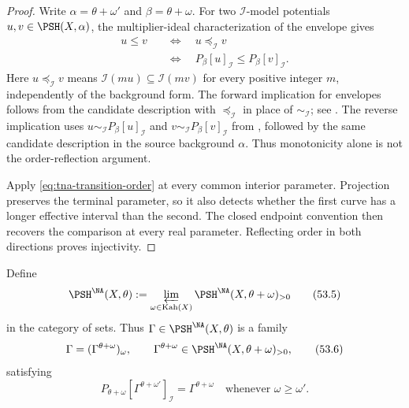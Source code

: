 \begin{proof}
Write $\alpha=\theta+\omega'$ and $\beta=\theta+\omega$.
For two $\mathcal I$-model potentials $u,v\in\PSH(X,\alpha)$,
the multiplier-ideal characterization of the envelope gives
\[
 \begin{split}
 u\leq v
 &\quad\Longleftrightarrow\quad
 u\preceq_{\mathcal I}v\\
 &\quad\Longleftrightarrow\quad
 P_\beta[u]_{\mathcal I}\leq P_\beta[v]_{\mathcal I}.
 \end{split}
\tag{53.4a}\label{eq:tna-transition-order}
\]
Here $u\preceq_{\mathcal I}v$ means
$\mathcal I(mu)\subseteq\mathcal I(mv)$ for every positive integer
$m$, independently of the background form.
The forward implication for envelopes follows from the candidate
description with $\preceq_{\mathcal I}$ in place of
$\sim_{\mathcal I}$; see
\cite[Corollary~6.1.3 and Proposition~6.1.3]{XiaBook}.
The reverse implication uses
$u\sim_{\mathcal I}P_\beta[u]_{\mathcal I}$ and
$v\sim_{\mathcal I}P_\beta[v]_{\mathcal I}$ from
, followed by the same candidate
description in the source background $\alpha$.
Thus monotonicity alone is not the order-reflection argument.

Apply \eqref{eq:tna-transition-order} at every common interior
parameter. Projection preserves the terminal parameter, so it
also detects whether the first curve has a longer effective interval
than the second. The closed endpoint convention then recovers
the comparison at every real parameter.
Reflecting order in both directions proves injectivity.
\end{proof}


\par\noindent\begin{minipage}{\textwidth}
\begin{definition}
\label{def:tna-pshna}
Define
\[
 \PSH^{\NA}(X,\theta)
 :=
 \varprojlim_{\omega\in\operatorname{Kah}(X)}
       \PSH^{\NA}(X,\theta+\omega)_{>0}
\tag{53.5}\label{eq:tna-inverse-limit}
\]
in the category of sets.  Thus
$\Gamma\in\PSH^{\NA}(X,\theta)$ is a family
\[
        \Gamma=(\Gamma^{\theta+\omega})_\omega,
\qquad
        \Gamma^{\theta+\omega}
          \in\PSH^{\NA}(X,\theta+\omega)_{>0},
\tag{53.6}\label{eq:tna-components}
\]
satisfying
\[
 P_{\theta+\omega}
 [\Gamma^{\theta+\omega'}]_{\mathcal I}
 =\Gamma^{\theta+\omega}
 \quad\text{whenever }\omega\geq\omega'.
\tag{53.7}\label{eq:tna-component-compatibility}
\]
\end{definition}
\end{minipage}\par\medskip

